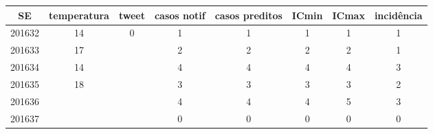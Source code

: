 \begin{tabular}{c|ccccccc}
  \hline
SE & temperatura & tweet & casos notif & casos preditos & ICmin & ICmax & incidência \\ 
  \hline
201632 & 14 & 0 & 1 & 1 & 1 & 1 & 1 \\ 
  201633 & 17 &  & 2 & 2 & 2 & 2 & 1 \\ 
  201634 & 14 &  & 4 & 4 & 4 & 4 & 3 \\ 
  201635 & 18 &  & 3 & 3 & 3 & 3 & 2 \\ 
  201636 &  &  & 4 & 4 & 4 & 5 & 3 \\ 
  201637 &  &  & 0 & 0 & 0 & 0 & 0 \\ 
   \hline
\end{tabular}
